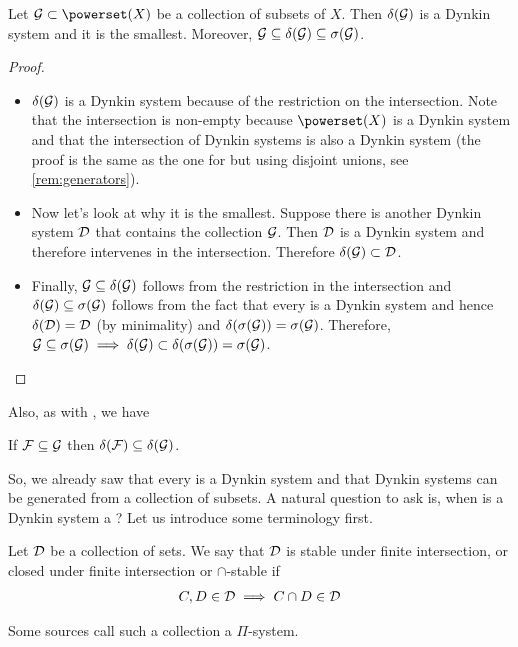 \begin{lem}
	Let $\calG \subset \powerset(X)$ be a collection of subsets of $X$. Then $\delta(\mathcal{G})$ is a Dynkin system and it is the smallest. Moreover, $\mathcal{G} \subseteq \delta(\mathcal{G}) \subseteq \sigma(\mathcal{G})$.
\end{lem}

\begin{proof}$ $\newline
	
	\begin{itemize}
		\item $\delta(\mathcal{G})$ is a Dynkin system because of the restriction on the intersection. Note that the intersection is non-empty because $\powerset(X)$ is a Dynkin system and that the intersection of Dynkin systems is also a Dynkin system (the proof is the same as the one for \sigas but using disjoint unions, see \autoref{rem:generators}).
		
		\item Now let's look at why it is the smallest. Suppose there is another Dynkin system $\mathcal{D}$ that contains the collection $\mathcal{G}$. Then $\mathcal{D}$ is a Dynkin system and therefore intervenes in the intersection. Therefore $\delta(\mathcal{G}) \subset \mathcal{D}$.
		
		\item Finally, $\mathcal{G} \subseteq \delta(\mathcal{G})$ follows from the restriction in the intersection and $\delta(\mathcal{G}) \subseteq \sigma(\mathcal{G})$ follows from the fact that every \siga is a Dynkin system and hence $\delta(\mathcal{D}) = \mathcal{D}$ (by minimality) and $\delta(\sigma(\mathcal{G})) = \sigma(\mathcal{G})$. Therefore, $\mathcal{G} \subseteq \sigma(\mathcal{G}) \implies \delta(\mathcal{G}) \subset \delta(\sigma(\mathcal{G})) = \sigma(\mathcal{G})$.
	\end{itemize}
\end{proof}

Also, as with \sigas, we have

\begin{remark}
	\label{remark:generators-dynkin}
	If $\mathcal{F} \subseteq \mathcal{G}$ then $\delta(\mathcal{F}) \subseteq \delta(\mathcal{G})$.
\end{remark}

So, we already saw that every \siga is a Dynkin system and that Dynkin systems can be generated from a collection of subsets. A natural question to ask is, when is a Dynkin system a \siga? Let us introduce some terminology first.


\begin{dfn}
	\label{dfn:istable}
	Let $\mathcal{D}$ be a collection of sets. We say that $\mathcal{D}$ is stable under finite intersection, or closed under finite intersection or $\cap$-stable if
	\begin{align*}
	C, D \in \mathcal{D} \implies C \cap D \in \mathcal{D}
	\end{align*}
	
	Some sources call such a collection a $\Pi$-system.
\end{dfn}

